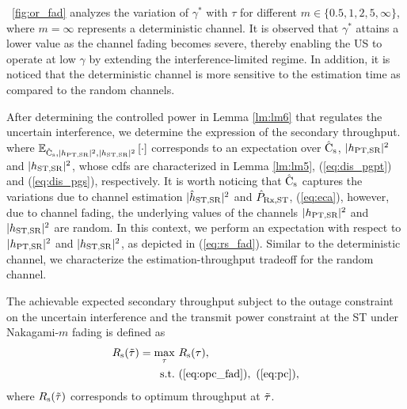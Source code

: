 \begin{remark} \label{rm:rm2}
\normalfont
\figurename~\ref{fig:or_fad} analyzes the variation of $\gamma^*$ with $\tau$ for different $m \in \{0.5, 1, 2, 5, \infty\}$, where $m = \infty$ represents a deterministic channel. It is observed that $\gamma^*$ attains a lower value as the channel fading becomes severe, thereby enabling the US to operate at low $\gamma$ by extending the interference-limited regime.  In addition, it is noticed that the deterministic channel is more sensitive to the estimation time as compared to the random channels.  
\end{remark}

After determining the controlled power in Lemma \ref{lm:lm6} that regulates the uncertain interference, we determine the expression of the secondary throughput.
where ${\mathbb E}_{\hat{\text{{C}}}_{\text{s}}, |h_{\text{PT,SR}}|^2, |h_{\text{ST,SR}}|^2}\left[ \cdot \right]$ corresponds to an expectation over $\hat{\text{{C}}}_{\text{s}}$, $|h_{\text{PT,SR}}|^2$ and $|h_{\text{ST,SR}}|^2$, whose cdfs are characterized in Lemma \ref{lm:lm5}, (\ref{eq:dis_pgpt}) and (\ref{eq:dis_pgs}), respectively. It is worth noticing that $\hat{\text{{C}}}_{\text{s}}$ captures the variations due to channel estimation $|\hat{h}_{\text{ST,SR}}|^2$ and $\hat{P}_{\text{Rx,ST}}$,  (\ref{eq:eca}), however, due to channel fading, the underlying values of the channels $|h_{\text{PT,SR}}|^2$ and $|h_{\text{ST,SR}}|^2$ are random. In this context, we perform an expectation with respect to $|h_{\text{PT,SR}}|^2$ and $|h_{\text{ST,SR}}|^2$, as depicted in (\ref{eq:rs_fad}).
Similar to the deterministic channel, we characterize the estimation-throughput tradeoff for the random channel. 
\begin{theorem} \label{th:th2}
\normalfont
The achievable expected secondary throughput subject to the outage constraint on the uncertain interference and the transmit power constraint at the ST under Nakagami-$m$ fading is defined as
\begin{align}
\trs(\ttau) = \maxi_{\tau}  & \text{      } {\rs(\tau)}, 
 \label{eq:sys_fad} \\
\text{s.t.} & \text{ } (\ref{eq:opc_fad}), \text{  } (\ref{eq:pc}), \nonumber 
 \end{align}
where $R_{\text{s}}(\tilde{\tau})$ corresponds to optimum throughput at $\tilde{\tau}$.  
\end{theorem}

